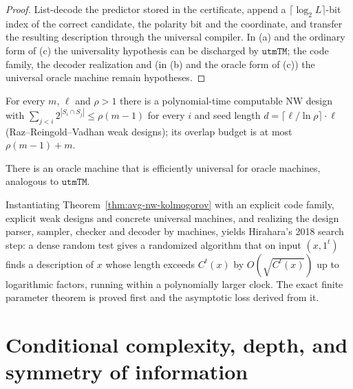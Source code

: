 \begin{proof}
  \leanok
  List-decode the predictor stored in the certificate, append a
  $\lceil \log_2 L \rceil$-bit index of the correct candidate, the polarity bit
  and the coordinate, and transfer the resulting description through the
  universal compiler. In (a) and the ordinary form of (c) the universality
  hypothesis can be discharged by $\mathtt{utmTM}$; the code family, the
  decoder realization and (in (b) and the oracle form of (c)) the universal
  oracle machine remain hypotheses.
\end{proof}

\begin{lemma}
  \label{lem:avg-rrv-design}
  For every $m$, $\ell$ and $\rho > 1$ there is a polynomial-time computable NW
  design with $\sum_{j<i} 2^{|S_i \cap S_j|} \le \rho(m-1)$ for every $i$ and
  seed length $d = \lceil \ell/\ln \rho \rceil \cdot \ell$
  (Raz--Reingold--Vadhan weak designs); its overlap budget is at most
  $\rho(m-1) + m$.
\end{lemma}

\begin{theorem}
  \label{thm:avg-oracle-utm}
  There is an oracle machine that is efficiently universal for oracle machines,
  analogous to $\mathtt{utmTM}$.
\end{theorem}

\begin{theorem}
  \label{thm:avg-nw-concrete}
  Instantiating Theorem~\ref{thm:avg-nw-kolmogorov} with an explicit code
  family, explicit weak designs and concrete universal machines, and realizing
  the design parser, sampler, checker and decoder by machines, yields
  Hirahara's 2018 search step: a dense random test gives a randomized algorithm
  that on input $(x, 1^t)$ finds a description of $x$ whose length exceeds
  $C^t(x)$ by $O(\sqrt{C^t(x)})$ up to logarithmic factors, running within a
  polynomially larger clock. The exact finite parameter theorem is proved first
  and the asymptotic loss derived from it.
\end{theorem}

\section{Conditional complexity, depth, and symmetry of information}

